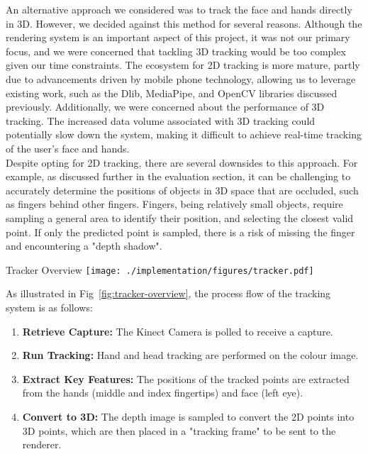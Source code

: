An alternative approach we considered was to track the face and hands directly in 3D. However, we decided against this method for several reasons. Although the rendering system is an important aspect of this project, it was not our primary focus, and we were concerned that tackling 3D tracking would be too complex given our time constraints. The ecosystem for 2D tracking is more mature, partly due to advancements driven by mobile phone technology, allowing us to leverage existing work, such as the Dlib, MediaPipe, and OpenCV libraries discussed previously. Additionally, we were concerned about the performance of 3D tracking. The increased data volume associated with 3D tracking could potentially slow down the system, making it difficult to achieve real-time tracking of the user's face and hands. \\

Despite opting for 2D tracking, there are several downsides to this approach. For example, as discussed further in the evaluation section, it can be challenging to accurately determine the positions of objects in 3D space that are occluded, such as fingers behind other fingers. Fingers, being relatively small objects, require sampling a general area to identify their position, and selecting the closest valid point. If only the predicted point is sampled, there is a risk of missing the finger and encountering a "depth shadow".

\begin{figureBox}[label={fig:tracker-overview}, width=1.0\linewidth]{Tracker Overview}
    \texttt{[image: ./implementation/figures/tracker.pdf]}
\end{figureBox}

As illustrated in Fig~\ref{fig:tracker-overview}, the process flow of the tracking system is as follows:

\begin{enumerate}[itemsep=-0.25em]
    \item \textbf{Retrieve Capture:} The Kinect Camera is polled to receive a capture.
    \item \textbf{Run Tracking:} Hand and head tracking are performed on the colour image.
    \item \textbf{Extract Key Features:} The positions of the tracked points are extracted from the hands (middle and index fingertips) and face (left eye).
    \item \textbf{Convert to 3D:} The depth image is sampled to convert the 2D points into 3D points, which are then placed in a "tracking frame" to be sent to the renderer.
\end{enumerate}

